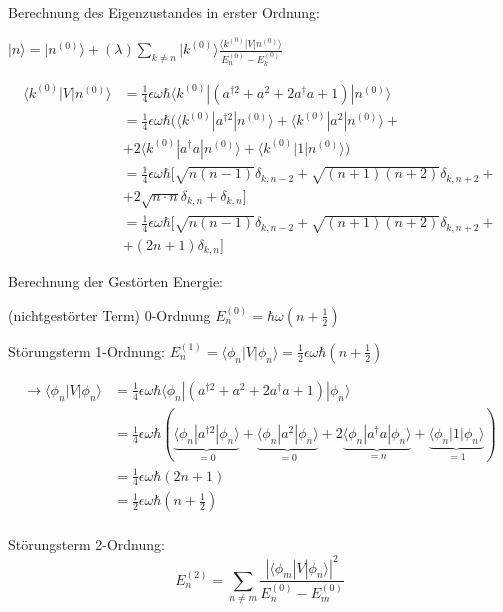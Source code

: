 Berechnung des Eigenzustandes in erster Ordnung:

\(|n\rangle =|n^{(0)}\rangle + (\lambda)\sum_{k\neq n}|k^{(0)}\rangle \frac{\langle k^{(0)}|V|n^{(0)}\rangle }{E_n^{(0)}-E_k^{(0)}}\)


\begin{align}
\langle k^{(0)}|V|n^{(0)}\rangle &=  \frac{1}{4}\epsilon \omega\hbar \langle k^{(0)}|(a^{\dagger 2} + a^2+2a^\dagger a+ 1)|n^{(0)}\rangle\\
&=\frac{1}{4}\epsilon \omega\hbar( \langle k^{(0)}|a^{\dagger 2}|n^{(0)}\rangle +\langle k^{(0)}| a^2|n^{(0)}\rangle+ \\
&+2\langle k^{(0)}|a^\dagger a|n^{(0)}\rangle+\langle k^{(0)}|1|n^{(0)}\rangle)\\
&=\frac{1}{4}\epsilon \omega\hbar[\sqrt{n(n-1)}\delta_{k,n-2}+\sqrt{(n+1)(n+2)}\delta_{k,n+2}+\\
&+2\sqrt{n\cdot n}\delta_{k,n}+\delta_{k,n}]\\
&=\frac{1}{4}\epsilon \omega\hbar[\sqrt{n(n-1)}\delta_{k,n-2}+\sqrt{(n+1)(n+2)}\delta_{k,n+2}+\\
&+(2n+1)\delta_{k,n}]
\end{align}


Berechnung der Gestörten Energie:

(nichtgestörter Term) 0-Ordnung \(E^{(0)}_n = \hbar \omega(n+\frac{1}{2})\)

Störungsterm 1-Ordnung: \(E^{(1)}_n = \langle \phi_n|V|\phi_n\rangle = \frac{1}{2}\epsilon \omega\hbar (n + \frac{1}{2}) \) 


\begin{align}
\rightarrow \langle \phi_n | V | \phi_n \rangle &= \frac{1}{4}\epsilon \omega\hbar \langle \phi_n |(a^{\dagger 2} + a^2+2a^\dagger a+ 1) | \phi_n \rangle \\
&= \frac{1}{4}\epsilon \omega\hbar (\underbrace{\langle \phi_n |a^{\dagger 2}|\phi_n \rangle}_{=0} + \underbrace{\langle \phi_n|a^2|\phi_n \rangle}_{=0}+2\underbrace{\langle \phi_n|a^\dagger a|\phi_n \rangle}_{=n}+ \underbrace{\langle \phi_n|1| \phi_n \rangle}_{=1})\\
&= \frac{1}{4}\epsilon \omega\hbar (2n + 1)\\
&= \frac{1}{2}\epsilon \omega\hbar (n + \frac{1}{2})\\
\end{align}

Störungsterm 2-Ordnung:
\[E^{(2)}_n = \sum_{n\neq m} \frac{|\langle \phi_m| V |\phi_n\rangle|^2}{E^{(0)}_n-E^{(0)}_m}\]

